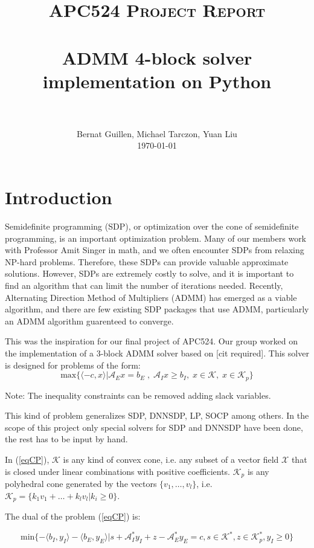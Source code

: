 \documentclass[paper=a4, fontsize=11pt]{scrartcl}
\title{
		\usefont{OT1}{bch}{b}{n}
		\normalfont \normalsize \textsc{APC524 Project Report} \\ [25pt]
		\horrule{0.5pt} \\[0.4cm]
		\huge ADMM 4-block solver implementation on Python \\
		\horrule{2pt} \\[0.5cm]
}
\author{
		\normalfont 								\normalsize
        Bernat Guillen, Michael Tarczon, Yuan Liu\\[-3pt]		\normalsize
        \today
}
\date{}
\numberwithin{equation}{section}		%
\numberwithin{figure}{section}			%
\numberwithin{table}{section}				%
\begin{document}
\maketitle
\section{Introduction}
Semidefinite programming (SDP), or optimization over the cone of semidefinite programming, is an important optimization problem.  Many of our members work with Professor Amit Singer in math, and we often encounter SDPs from relaxing NP-hard problems.  Therefore, these SDPs can provide valuable approximate solutions.  However, SDPs are extremely costly to solve, and it is important to find an algorithm that can limit the number of iterations needed.  Recently, Alternating Direction Method of Multipliers (ADMM) has emerged as a viable algorithm, and there are few existing SDP packages that use ADMM, particularly an ADMM algorithm guarenteed to converge.

This was the inspiration for our final project of APC524. Our group worked on the implementation of a 3-block ADMM solver based on [cit required]. This solver is designed for problems of the form:
\begin{equation}
\label{eqCP}
	\text{max}\{\langle -c,x\rangle | \mathcal{A}_E x = b_E\;,\;\mathcal{A}_I x\geq b_I, \;x\in \mathcal{K},\; x\in\mathcal{K}_p\}
\end{equation}

Note: The inequality constraints can be removed adding slack variables.

This kind of problem generalizes SDP, DNNSDP, LP, SOCP among others. In the scope of this project only special solvers for SDP and DNNSDP have been done, the rest has to be input by hand. 

In (\ref{eqCP}), $\mathcal{K}$ is any kind of convex cone, i.e. any subset of a vector field $\mathcal{X}$ that is closed under linear combinations with positive coefficients. $\mathcal{K}_p$ is any polyhedral cone generated by the vectors $\{v_1,\dots,v_l\}$, i.e. $\mathcal{K}_p = \{k_1v_1 + \dots + k_l v_l | k_i \geq 0\}$.

The dual of the problem (\ref{eqCP}) is:

\begin{equation}
\label{eqCPdual}
\text{min}\{-\langle b_I , y_I\rangle -\langle b_E , y_E\rangle | s + \mathcal{A}^{*}_{I} y_I + z - \mathcal{A}^{*}_{E} y_E = c, s\in \mathcal{K}^*, z \in \mathcal{K}_p^*, y_I \geq 0\}
\end{equation}
\end{document}
